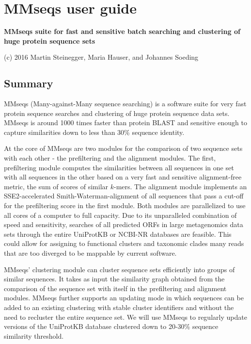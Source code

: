 \documentclass[11pt,a4paper]{report}
\begin{document}
\chapter*{MMseqs user guide}
\renewcommand*\thesection{\arabic{section}}

\textbf{MMseqs suite for fast and sensitive batch searching and clustering
of huge protein sequence sets}

(c) 2016 Martin Steinegger, Maria Hauser, and Johannes Soeding


\section{Summary}

MMseqs (Many-against-Many sequence searching) is a software suite
for very fast protein sequence searches and clustering of huge protein
sequence data sets. MMseqs is around 1000 times faster than protein
BLAST and sensitive enough to capture similarities down to less than
30\% sequence identity.

At the core of MMseqs are two modules for the comparison of two sequence
sets with each other - the prefiltering and the alignment modules.
The first, prefiltering module computes the similarities between all
sequences in one set with all sequences in the other based on a very
fast and sensitive alignment-free metric, the sum of scores of similar
$k$-mers. The alignment module implements an SSE2-accelerated Smith-Waterman-alignment
of all sequences that pass a cut-off for the prefiltering score in
the first module. Both modules are parallelized to use all cores of
a computer to full capacity. Due to its unparalleled combination of
speed and sensitivity, searches of all predicted ORFs in large metagenomics
data sets through the entire UniProtKB or NCBI-NR databases are feasible.
This could allow for assigning to functional clusters and taxonomic
clades many reads that are too diverged to be mappable by current
software.

MMseqs' clustering module can cluster sequence sets efficiently into
groups of similar sequences. It takes as input the similarity graph
obtained from the comparison of the sequence set with itself in the
prefiltering and alignment modules. MMseqs further supports an updating
mode in which sequences can be added to an existing clustering with
stable cluster identifiers and without the need to recluster the entire
sequence set. We will use MMseqs to regularly update versions of the
UniProtKB database clustered down to 20-30\% sequence similarity threshold.
\end{document}
